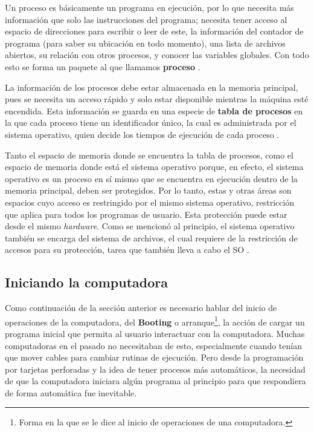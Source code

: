 \documentclass[letterpaper,12pt,oneside]{book}
\begin{document}
		Un proceso es básicamente un programa en ejecución, por lo que necesita más información que solo las instrucciones del programa; necesita
		tener acceso al espacio de direcciones para escribir o leer de este, la información del contador de programa
		(para saber su ubicación en todo momento), una lista de archivos abiertos, su relación con otros procesos, y conocer las variables globales. Con todo esto se forma un paquete al que llamamos \textbf{proceso} \cite{tanenbaum_modern_2002}.
  
        La información de los procesos
		debe estar almacenada en la memoria principal, pues se necesita un acceso rápido y solo estar disponible mientras la máquina esté encendida. Esta
		información se guarda en una especie de \textbf{tabla de procesos} en la que cada proceso tiene un identificador único, la cual es administrada 
		por el sistema operativo, quien decide los tiempos de ejecución de cada proceso \cite{tanenbaum_modern_2002}.
		
		Tanto el espacio de memoria donde se encuentra la tabla de procesos, como el espacio de memoria donde está el sistema operativo porque,
		en efecto, el sistema operativo es un proceso en sí mismo que se encuentra en ejecución dentro de la memoria principal, deben ser protegidos.
		Por lo tanto, estas y otras áreas son espacios cuyo acceso es restringido por el mismo sistema operativo, restricción que aplica para todos los 	
		programas de usuario. Esta protección puede estar desde el mismo \textit{hardware}. Como se mencionó al principio, el sistema operativo también 
		se encarga del sistema
		de archivos, el cual requiere de la restricción de accesos para su protección, tarea que también lleva a cabo el SO 
		\cite{tanenbaum_modern_2002}.
		 
		\subsection{Iniciando la computadora}
		
		Como continuación de la sección anterior es necesario hablar del inicio de operaciones de la computadora, del \textbf{Booting} o arranque\footnote{Forma
		en la que se le dice al inicio de operaciones de una computadora.}, la acción de cargar un programa inicial que permita al usuario interactuar con
		la computadora. Muchas computadoras en el pasado no necesitaban de esto, especialmente cuando tenían que mover cables
		para cambiar rutinas de ejecución. Pero desde la programación por tarjetas perforadas y la idea de tener procesos más automáticos, la necesidad
		de que la computadora iniciara algún programa al principio para que respondiera de forma automática fue inevitable\cite{tanenbaum_modern_2002}.
\end{document}

